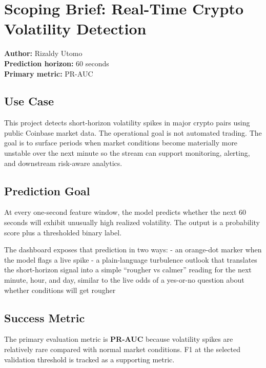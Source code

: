 \documentclass[
]{article}
\author{}
\date{}
\begin{document}
\hypertarget{scoping-brief-real-time-crypto-volatility-detection}{%
\section{Scoping Brief: Real-Time Crypto Volatility
Detection}\label{scoping-brief-real-time-crypto-volatility-detection}}

\textbf{Author:} Rizaldy Utomo\\
\textbf{Prediction horizon:} 60 seconds\\
\textbf{Primary metric:} PR-AUC

\hypertarget{use-case}{%
\subsection{Use Case}\label{use-case}}

This project detects short-horizon volatility spikes in major crypto
pairs using public Coinbase market data. The operational goal is not
automated trading. The goal is to surface periods when market conditions
become materially more unstable over the next minute so the stream can
support monitoring, alerting, and downstream risk-aware analytics.

\hypertarget{prediction-goal}{%
\subsection{Prediction Goal}\label{prediction-goal}}

At every one-second feature window, the model predicts whether the next
60 seconds will exhibit unusually high realized volatility. The output
is a probability score plus a thresholded binary label.

The dashboard exposes that prediction in two ways: - an orange-dot
marker when the model flags a live spike - a plain-language turbulence
outlook that translates the short-horizon signal into a simple ``rougher
vs calmer'' reading for the next minute, hour, and day, similar to the
live odds of a yes-or-no question about whether conditions will get
rougher

\hypertarget{success-metric}{%
\subsection{Success Metric}\label{success-metric}}

The primary evaluation metric is \textbf{PR-AUC} because volatility
spikes are relatively rare compared with normal market conditions. F1 at
the selected validation threshold is tracked as a supporting metric.
\end{document}
